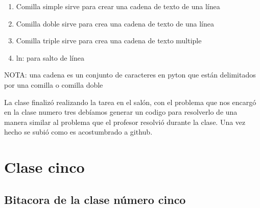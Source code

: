 \documentclass{book}
\begin{document}
\begin{enumerate}
	\item Comilla simple  sirve para crear una cadena de texto de una línea
	\item Comilla doble  sirve para crea una cadena de texto de una línea
	\item Comilla triple  sirve para crea una cadena de texto multiple
	\item ln: para salto de línea
\end{enumerate}

NOTA: una cadena es un conjunto de caracteres en pyton que están delimitados por una comilla o comilla doble

La clase finalizó realizando la tarea en el salón, con el problema que nos encargó en la clase numero tres debíamos generar un codigo para resolverlo de una manera similar al problema que el profesor resolvió durante la clase. Una vez hecho se subió como es acostumbrado a github.

\chapter{Clase cinco}
\section{Bitacora de la clase número cinco}
\end{document}
